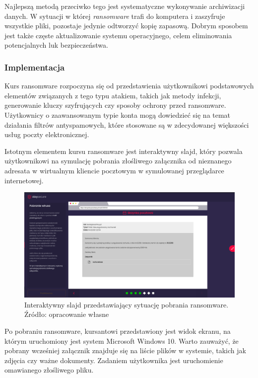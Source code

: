 \documentclass[12pt,twoside]{article}
\begin{document}
Najlepszą metodą przeciwko tego  jest systematyczne wykonywanie archiwizacji danych. W sytuacji w której \emph{ransomware} trafi do komputera i zaszyfruje wszystkie pliki, pozostaje jedynie odtworzyć kopię zapasową. Dobrym sposobem jest także częste aktualizowanie systemu operacyjnego, celem eliminowania potencjalnych luk bezpieczeństwa.

\subsubsection{Implementacja}

Kurs ransomware rozpoczyna się od przedstawienia użytkownikowi podstawowych elementów związanych z tego typu atakiem, takich jak metody infekcji, generowanie kluczy szyfrujących czy sposoby ochrony przed ransomware. Użytkownicy o zaawansowanym typie konta mogą dowiedzieć się na temat działania filtrów antyspamowych, które stosowane są w zdecydowanej większości usług poczty elektronicznej.

Istotnym elementem kursu ransomware jest interaktywny slajd, który pozwala użytkownikowi na symulację pobrania złośliwego załącznika od nieznanego adresata w wirtualnym kliencie pocztowym w symulowanej przeglądarce internetowej. 

\begin{figure}[H]
	\centering
	\includegraphics[width=0.99\linewidth]{figures/ransomware-slide-screenshot1}
	\caption{Interaktywny slajd przedstawiający sytuację pobrania ransomware. Źródło: opracowanie własne}
\end{figure}

Po pobraniu ransomware, kursantowi przedstawiony jest widok ekranu, na którym uruchomiony jest system Microsoft Windows 10. Warto zauważyć, że pobrany wcześniej załącznik znajduje się na liście plików w systemie, takich jak zdjęcia czy ważne dokumenty. Zadaniem użytkownika jest uruchomienie omawianego złośliwego pliku.
\end{document}
